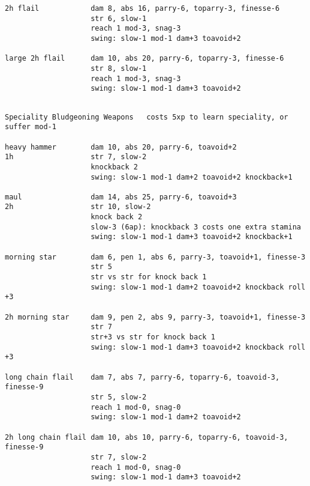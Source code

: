 \begin{verbatim}
2h flail            dam 8, abs 16, parry-6, toparry-3, finesse-6
                    str 6, slow-1
                    reach 1 mod-3, snag-3
                    swing: slow-1 mod-1 dam+3 toavoid+2

large 2h flail      dam 10, abs 20, parry-6, toparry-3, finesse-6
                    str 8, slow-1
                    reach 1 mod-3, snag-3
                    swing: slow-1 mod-1 dam+3 toavoid+2


\end{verbatim} \pagebreak[1] \begin{verbatim}
Speciality Bludgeoning Weapons   costs 5xp to learn speciality, or suffer mod-1

heavy hammer        dam 10, abs 20, parry-6, toavoid+2
1h                  str 7, slow-2
                    knockback 2
                    swing: slow-1 mod-1 dam+2 toavoid+2 knockback+1

maul                dam 14, abs 25, parry-6, toavoid+3
2h                  str 10, slow-2
                    knock back 2
                    slow-3 (6ap): knockback 3 costs one extra stamina
                    swing: slow-1 mod-1 dam+3 toavoid+2 knockback+1

morning star        dam 6, pen 1, abs 6, parry-3, toavoid+1, finesse-3
                    str 5
                    str vs str for knock back 1
                    swing: slow-1 mod-1 dam+2 toavoid+2 knockback roll +3

2h morning star     dam 9, pen 2, abs 9, parry-3, toavoid+1, finesse-3
                    str 7
                    str+3 vs str for knock back 1
                    swing: slow-1 mod-1 dam+3 toavoid+2 knockback roll +3

long chain flail    dam 7, abs 7, parry-6, toparry-6, toavoid-3, finesse-9
                    str 5, slow-2
                    reach 1 mod-0, snag-0
                    swing: slow-1 mod-1 dam+2 toavoid+2

2h long chain flail dam 10, abs 10, parry-6, toparry-6, toavoid-3, finesse-9
                    str 7, slow-2
                    reach 1 mod-0, snag-0
                    swing: slow-1 mod-1 dam+3 toavoid+2

\end{verbatim}
\normalsize







